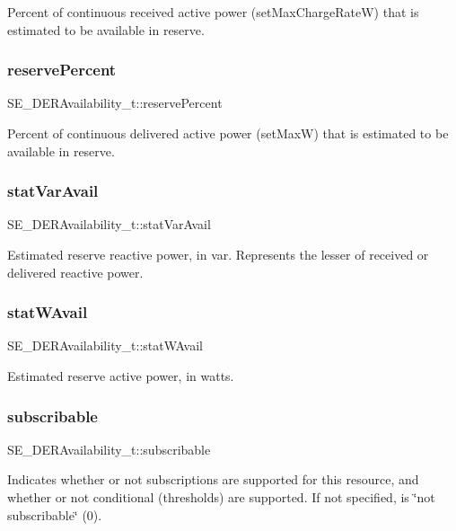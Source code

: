 Percent of continuous received active power (set\+Max\+Charge\+RateW) that is estimated to be available in reserve. \mbox{\label{group__DERAvailability_ga186a342c1180f00c5b9ba0d8b74d41f3}} 
\subsubsection{\texorpdfstring{reserve\+Percent}{reservePercent}}
{\footnotesize\ttfamily S\+E\+\_\+\+D\+E\+R\+Availability\+\_\+t\+::reserve\+Percent}

Percent of continuous delivered active power (set\+MaxW) that is estimated to be available in reserve. \mbox{\label{group__DERAvailability_ga71bc8d7e0861abe18b80c3f3850f472b}} 
\subsubsection{\texorpdfstring{stat\+Var\+Avail}{statVarAvail}}
{\footnotesize\ttfamily S\+E\+\_\+\+D\+E\+R\+Availability\+\_\+t\+::stat\+Var\+Avail}

Estimated reserve reactive power, in var. Represents the lesser of received or delivered reactive power. \mbox{\label{group__DERAvailability_gafa87b4a21d462f0eff8fbebff012f8c1}} 
\subsubsection{\texorpdfstring{stat\+W\+Avail}{statWAvail}}
{\footnotesize\ttfamily S\+E\+\_\+\+D\+E\+R\+Availability\+\_\+t\+::stat\+W\+Avail}

Estimated reserve active power, in watts. \mbox{\label{group__DERAvailability_gac57295f5506a2a4f18e4044cf783be4e}} 
\subsubsection{\texorpdfstring{subscribable}{subscribable}}
{\footnotesize\ttfamily S\+E\+\_\+\+D\+E\+R\+Availability\+\_\+t\+::subscribable}

Indicates whether or not subscriptions are supported for this resource, and whether or not conditional (thresholds) are supported. If not specified, is \char`\"{}not subscribable\char`\"{} (0). 